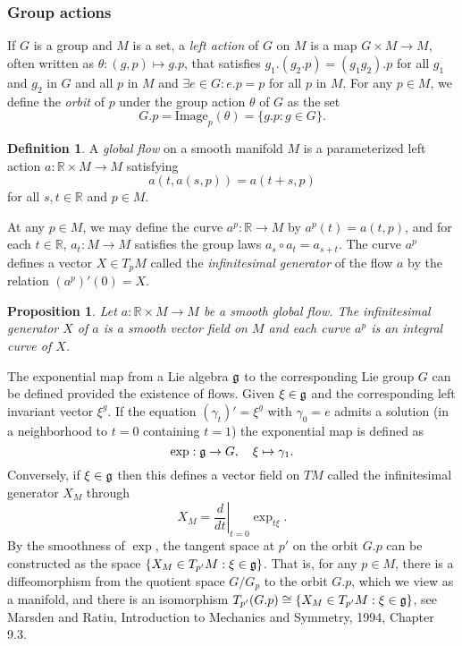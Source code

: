\documentclass{article}
\theoremstyle{plain}
\newtheorem{prop}[teo]{Proposition}
\theoremstyle{definition}
\newtheorem{defin}[teo]{Definition}
\numberwithin{equation}{section}
\newcommand{\R}{\ensuremath{\mathbb{R}}}
\newcommand{\mf}{\ensuremath{\mathfrak}}
\begin{document}
\subsubsection{Group actions}

If $G$ is a group and $M$ is a set, a \textit{left action} of $G$ on $M$ is a map $G\times M\to M$, often written as $\theta: (g,p)\mapsto g.p$, that satisfies $g_1.(g_2.p)=(g_1g_2).p$ for all $g_1$ and $g_2$ in $G$ and all $p$ in $M$ and $\exists e\in G: e.p=p$ for all $p$ in $M$. For any $p\in M$, we define the \textit{orbit} of $p$ under the group action $\theta$ of $G$ as the set 
\[
   G.p = \mathrm{Image}_p(\theta)= \{g.p:g\in G\}.
\]



\begin{defin}
	A \textit{global flow} on a smooth manifold $M$ is a parameterized left action $a:\R\times M\to M$ satisfying
	\[
	  a(t,a(s,p))=a(t+s,p)
	\]
	for all $s,t\in\R$ and $p\in M$. 
\end{defin}

At any $p\in M$, we may define the curve $a^p:\R\to M$ by $a^p(t)=a(t,p)$, and for each $t\in\R$, $a_t:M\to M$ satisfies the group laws $a_s\circ a_t=a_{s+t}$. The curve $a^p$ defines a vector $X\in T_pM$ called the \textit{infinitesimal generator} of the flow $a$ by the relation $(a^p)'(0)=X$.

\begin{prop}
	Let $a:\R\times M\to M$ be a smooth global flow. The infinitesimal generator $X$ of $a$ is a smooth vector field on $M$ and each curve $a^p$ is an integral curve of $X$.
\end{prop}

The exponential map from a Lie algebra $\mf g$ to the corresponding Lie group $G$ can be defined provided the existence of flows. Given $\xi\in\mf g$ and the corresponding left invariant vector $\xi^g$. If the equation $(\gamma_t)'=\xi^g$ with $\gamma_0=e$ admits a solution (in a neighborhood to $t=0$ containing $t=1$) the exponential map is defined as
\[
\exp: \mf g\to G,\quad \xi \mapsto \gamma_1.
\]
Conversely, if $\xi\in \mf g$ then this defines a vector field on $TM$ called the infinitesimal generator $X_M$ through
\[
X_M=\left.\frac{d}{dt}\right|_{t=0}\exp_{t\xi}.
\]
By the smoothness of $\exp$, the tangent space at $p'$ on the orbit $G.p$ can be constructed as the space $\{X_M\in T_{p'}M : \xi\in\mf g\}$. That is, for any $p\in M$, there is a diffeomorphism from the quotient space $G/G_{p}$ to the orbit $G.p$, which we view as a manifold, and there is an isomorphism $T_{p'}(G.p)\cong\{X_M\in T_{p'}M : \xi\in\mf g\}$, see Marsden and Ratiu, Introduction to Mechanics and Symmetry, 1994, Chapter 9.3.
\end{document}
